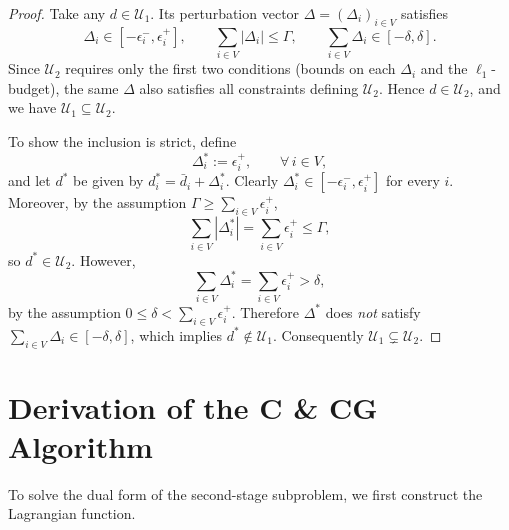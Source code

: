 \documentclass[preprint,12pt,authoryear]{elsarticle}
\begin{document}
\begin{proof}
Take any \(d\in\mathcal{U}_1\). Its perturbation vector \(\Delta=(\Delta_i)_{i\in V}\) satisfies
\[
\Delta_i\in[-\epsilon_i^-,\epsilon_i^+],\qquad
\sum_{i\in V}|\Delta_i|\le\Gamma,\qquad
\sum_{i\in V}\Delta_i\in[-\delta,\delta].
\]
Since \(\mathcal{U}_2\) requires only the first two conditions (bounds on each \(\Delta_i\) and the \(\ell_1\)-budget), the same \(\Delta\) also satisfies all constraints defining \(\mathcal{U}_2\). Hence \(d\in\mathcal{U}_2\), and we have \(\mathcal{U}_1\subseteq\mathcal{U}_2\).

To show the inclusion is strict, define
\[
\Delta^*_i := \epsilon_i^+,\qquad\forall\,i\in V,
\]
and let \(d^*\) be given by \(d^*_i=\bar d_i+\Delta^*_i\). Clearly \(\Delta^*_i\in[-\epsilon_i^-,\epsilon_i^+]\) for every \(i\). Moreover, by the assumption \(\Gamma\ge\sum_{i\in V}\epsilon_i^+\),
\[
\sum_{i\in V}|\Delta^*_i|
= \sum_{i\in V}\epsilon_i^+\le\Gamma,
\]
so \(d^*\in\mathcal{U}_2\). However,
\[
\sum_{i\in V}\Delta^*_i
=\sum_{i\in V}\epsilon_i^+>\delta,
\]
by the assumption \(0\le\delta<\sum_{i\in V}\epsilon_i^+\). Therefore \(\Delta^*\) does \emph{not} satisfy \(\sum_{i\in V}\Delta_i\in[-\delta,\delta]\), which implies \(d^*\notin\mathcal{U}_1\). Consequently \(\mathcal{U}_1\subsetneq\mathcal{U}_2\).
\end{proof}


\section{Derivation of the C \& CG Algorithm}\label{ap2}

To solve the dual form of the second-stage subproblem, we first construct the Lagrangian function.
\end{document}
